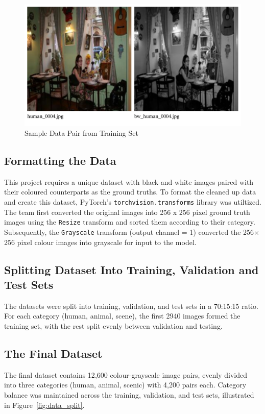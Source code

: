 \documentclass{article} %
\begin{document}
\begin{figure}[htbp]            %
  \centering
  \includegraphics[width=0.65\linewidth]{Figs/Data Example.png}
  \caption{Sample Data Pair from Training Set}
  \label{fig:data_example}
\end{figure}

\subsection{Formatting the Data}

This project requires a unique dataset with black-and-white images paired with their coloured counterparts as the ground truths. To format the cleaned up data and create this dataset, 
PyTorch's \verb|torchvision.transforms| library was utiltized. The team first converted the original images into 256 x 256 pixel ground truth images using the \verb|Resize| transform 
and sorted them according to their category. Subsequently, the \verb|Grayscale| transform (output channel = 1) converted the 256$\times$256 pixel colour images into grayscale for input to the model.

\subsection{Splitting Dataset Into Training, Validation and Test Sets}

The datasets were split into training, validation, and test sets in a 70:15:15 ratio. For each category (human, animal, scene), the first 2940 images formed the training set, with the rest
split evenly between validation and testing.

\subsection{The Final Dataset}

The final dataset contains 12{,}600 colour-grayscale image pairs, evenly divided into three categories (human, animal, scenic) with 4{,}200 pairs each. Category balance was maintained across 
the training, validation, and test sets, illustrated in Figure~\ref{fig:data_split}. 
\end{document}
